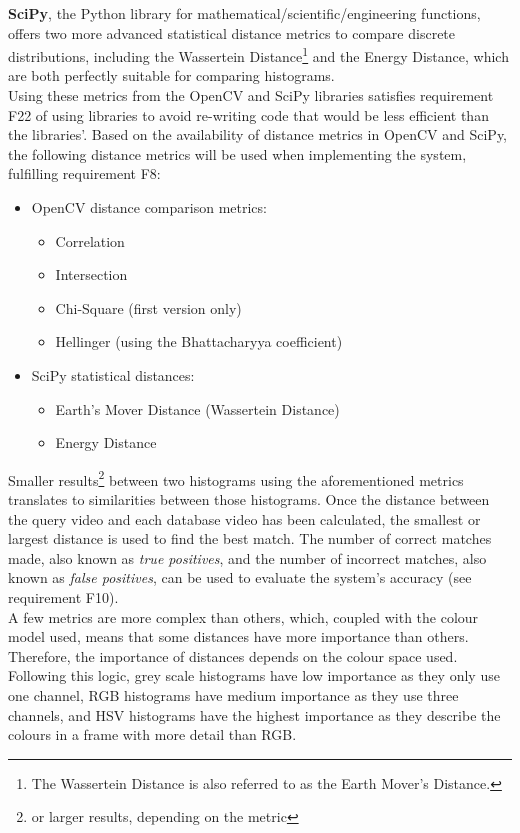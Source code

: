 \textbf{SciPy}, the Python library for mathematical/scientific/engineering functions, offers two more advanced statistical distance metrics to compare discrete distributions, including the Wassertein Distance\footnote{The Wassertein Distance is also referred to as the Earth Mover’s Distance.} and the Energy Distance, which are both perfectly suitable for comparing histograms.\\

Using these metrics from the OpenCV and SciPy libraries satisfies requirement F22 of using libraries to avoid re-writing code that would be less efficient than the libraries'. Based on the availability of distance metrics in OpenCV and SciPy, the following distance metrics will be used when implementing the system, fulfilling requirement F8:

\begin{itemize}
    \item OpenCV distance comparison metrics:
    \begin{itemize}
        \item Correlation
        \item Intersection
        \item Chi-Square (first version only)
        \item Hellinger (using the Bhattacharyya coefficient)
    \end{itemize}
    \item SciPy statistical distances:
    \begin{itemize}
        \item Earth's Mover Distance (Wassertein Distance)
        \item Energy Distance
    \end{itemize}
   
\end{itemize}

Smaller results\footnote{or larger results, depending on the metric} between two histograms using the aforementioned metrics translates to similarities between those histograms. Once the distance between the query video and each database video has been calculated, the smallest or largest distance is used to find the best match. The number of correct matches made, also known as \textit{true positives}, and the number of incorrect matches, also known as \textit{false positives}, can be used to evaluate the system's accuracy (see requirement F10).\\

A few metrics are more complex than others, which, coupled with the colour model used, means that some distances have more importance than others. Therefore, the importance of distances depends on the colour space used. Following this logic, grey scale histograms have low importance as they only use one channel, RGB histograms have medium importance as they use three channels, and HSV histograms have the highest importance as they describe the colours in a frame with more detail than RGB.


